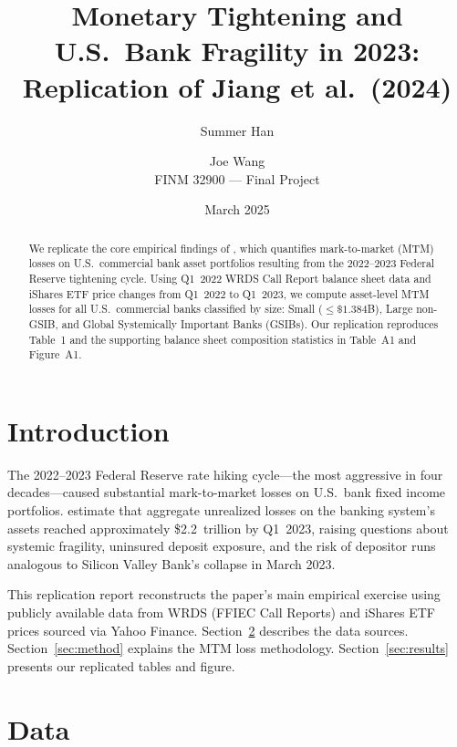 \documentclass[12pt]{article}
\title{Monetary Tightening and U.S.\ Bank Fragility in 2023:\\
       Replication of Jiang et al.\ (2024)}
\author{Summer Han \and Joe Wang\\[4pt]
        \small FINM 32900 --- Final Project}
\date{March 2025}
\begin{document}
\maketitle

\begin{abstract}
We replicate the core empirical findings of \citet{jiang2024monetary},
which quantifies mark-to-market (MTM) losses on U.S.\ commercial bank
asset portfolios resulting from the 2022--2023 Federal Reserve tightening
cycle.  Using Q1~2022 WRDS Call Report balance sheet data and iShares ETF
price changes from Q1~2022 to Q1~2023, we compute asset-level MTM losses
for all U.S.\ commercial banks classified by size: Small ($\leq\$1.384$B),
Large non-GSIB, and Global Systemically Important Banks (GSIBs).
Our replication reproduces Table~1 and the supporting balance sheet
composition statistics in Table~A1 and Figure~A1.
\end{abstract}

\tableofcontents
\newpage

\section{Introduction}

The 2022--2023 Federal Reserve rate hiking cycle---the most aggressive in
four decades---caused substantial mark-to-market losses on U.S.\ bank fixed
income portfolios.  \citet{jiang2024monetary} estimate that aggregate
unrealized losses on the banking system's assets reached approximately
\$2.2~trillion by Q1~2023, raising questions about systemic fragility,
uninsured deposit exposure, and the risk of depositor runs analogous to
Silicon Valley Bank's collapse in March 2023.

This replication report reconstructs the paper's main empirical exercise
using publicly available data from WRDS (FFIEC Call Reports) and iShares
ETF prices sourced via Yahoo Finance.  Section~\ref{sec:data} describes the
data sources.  Section~\ref{sec:method} explains the MTM loss methodology.
Section~\ref{sec:results} presents our replicated tables and figure.

\section{Data}\label{sec:data}
\end{document}
